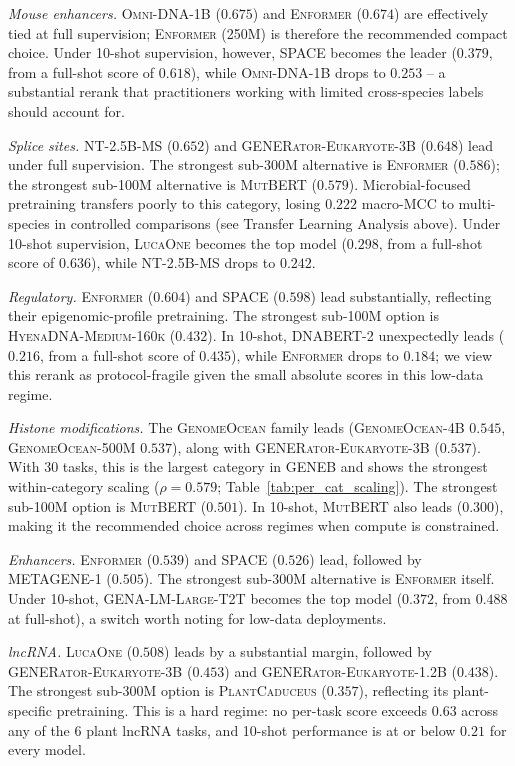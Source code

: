 \documentclass{article}
\theoremstyle{plain}
\theoremstyle{definition}
\theoremstyle{remark}
\begin{document}
\textit{Mouse enhancers.} \textsc{Omni-DNA-1B} ($0.675$) and
\textsc{Enformer} ($0.674$) are effectively tied at full supervision;
\textsc{Enformer} (250M) is therefore the recommended compact choice. Under 10-shot supervision, however,
\textsc{SPACE} becomes the leader ($0.379$, from a full-shot score of
$0.618$), while \textsc{Omni-DNA-1B} drops to $0.253$ -- a substantial
rerank that practitioners working with limited cross-species labels
should account for.

\textit{Splice sites.} \textsc{NT-2.5B-MS} ($0.652$) and
\textsc{GENERator-Eukaryote-3B} ($0.648$) lead under full supervision.
The strongest sub-300M alternative is \textsc{Enformer} ($0.586$);
the strongest sub-100M alternative is \textsc{MutBERT} ($0.579$).
Microbial-focused pretraining transfers poorly to this category,
losing $0.222$ macro-MCC to multi-species in controlled comparisons
(see Transfer Learning Analysis above). Under 10-shot supervision, \textsc{LucaOne} becomes
the top model ($0.298$, from a full-shot score of $0.636$), while
\textsc{NT-2.5B-MS} drops to $0.242$.

\textit{Regulatory.} \textsc{Enformer} ($0.604$) and \textsc{SPACE}
($0.598$) lead substantially, reflecting their epigenomic-profile
pretraining. The strongest sub-100M option is \textsc{HyenaDNA-Medium-160k}
($0.432$). In 10-shot, \textsc{DNABERT-2} unexpectedly leads
($0.216$, from a full-shot score of $0.435$), while \textsc{Enformer}
drops to $0.184$; we view this rerank as protocol-fragile given the
small absolute scores in this low-data regime.

\textit{Histone modifications.} The \textsc{GenomeOcean} family leads
(\textsc{GenomeOcean-4B} $0.545$, \textsc{GenomeOcean-500M} $0.537$),
along with \textsc{GENERator-Eukaryote-3B} ($0.537$). With 30 tasks,
this is the largest category in GENEB and shows the strongest
within-category scaling ($\rho = 0.579$; Table~\ref{tab:per_cat_scaling}).
The strongest sub-100M option is \textsc{MutBERT} ($0.501$). In
10-shot, \textsc{MutBERT} also leads ($0.300$), making it the
recommended choice across regimes when compute is constrained.

\textit{Enhancers.} \textsc{Enformer} ($0.539$) and \textsc{SPACE}
($0.526$) lead, followed by \textsc{METAGENE-1} ($0.505$). The
strongest sub-300M alternative is \textsc{Enformer} itself.
Under 10-shot, \textsc{GENA-LM-Large-T2T} becomes the top model
($0.372$, from $0.488$ at full-shot), a switch worth noting for
low-data deployments.

\textit{lncRNA.} \textsc{LucaOne} ($0.508$) leads by a substantial
margin, followed by \textsc{GENERator-Eukaryote-3B} ($0.453$) and
\textsc{GENERator-Eukaryote-1.2B} ($0.438$). The strongest sub-300M
option is \textsc{PlantCaduceus} ($0.357$), reflecting its
plant-specific pretraining. This is a hard regime: no per-task score
exceeds $0.63$ across any of the 6 plant lncRNA tasks, and 10-shot
performance is at or below $0.21$ for every model.
\end{document}
